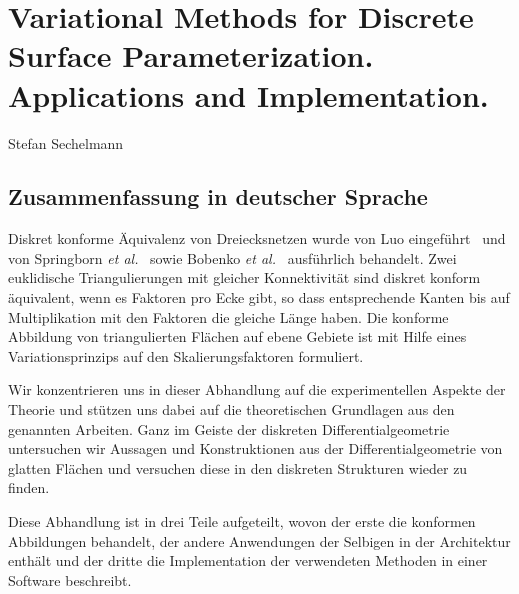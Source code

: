 \documentclass[Thesis.tex]{subfiles}
\begin{document}
\section*{Variational Methods for Discrete Surface Parameterization. Applications and Implementation.}
Stefan Sechelmann
\subsection*{Zusammenfassung in deutscher Sprache}

Diskret konforme \"{A}quivalenz von Dreiecksnetzen wurde von Luo eingef{\"u}hrt~\cite{Luo2004:Yamabe} und von Springborn {\it et al.}~\cite{Springborn2008} sowie Bobenko {\it et al.}~\cite{BPS2015:dconf} ausf{\"u}hrlich behandelt.
Zwei euklidische Triangulierungen mit gleicher Konnektivit\"{a}t sind diskret konform \"{a}quivalent, wenn es  Faktoren pro Ecke gibt, so dass entsprechende Kanten bis auf Multiplikation mit den Faktoren die gleiche L\"{a}nge haben.
Die konforme Abbildung von triangulierten Fl\"{a}chen auf ebene Gebiete ist mit Hilfe eines Variationsprinzips auf den Skalierungsfaktoren formuliert.


Wir konzentrieren uns in dieser Abhandlung auf die experimentellen Aspekte der Theorie und st\"{u}tzen uns dabei auf die theoretischen Grundlagen aus den genannten Arbeiten.
Ganz im Geiste der diskreten Differentialgeometrie untersuchen wir Aussagen und Konstruktionen aus der Differentialgeometrie von glatten Fl\"{a}chen und versuchen diese in den diskreten Strukturen wieder zu finden.

Diese Abhandlung ist in drei Teile aufgeteilt, wovon der erste die konformen Abbildungen behandelt, der andere Anwendungen der Selbigen in der Architektur enth\"{a}lt und der dritte die Implementation der verwendeten Methoden in einer Software beschreibt.
\end{document}

